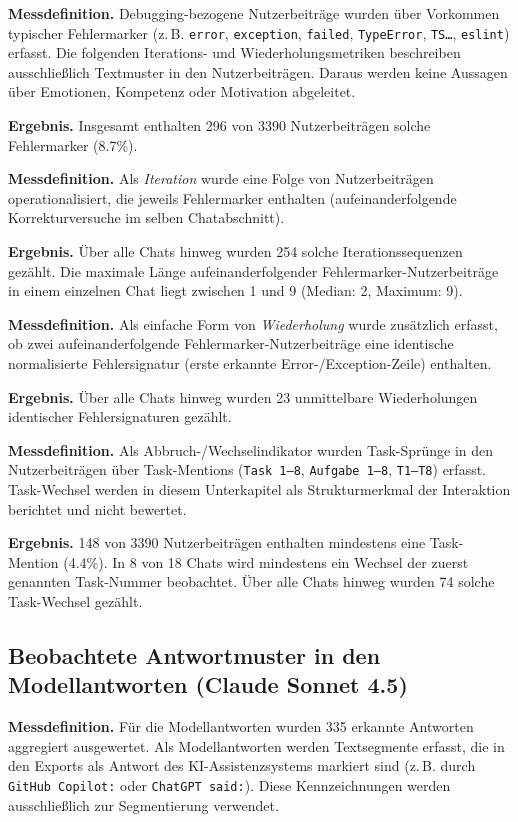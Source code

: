  \textbf{Messdefinition.} Debugging-bezogene Nutzerbeiträge wurden über Vorkommen typischer Fehlermarker (z.\,B. \texttt{error}, \texttt{exception}, \texttt{failed}, \texttt{TypeError}, \texttt{TS\dots}, \texttt{eslint}) erfasst.
Die folgenden Iterations- und Wiederholungsmetriken beschreiben ausschließlich Textmuster in den Nutzerbeiträgen. Daraus werden keine Aussagen über Emotionen, Kompetenz oder Motivation abgeleitet.

 \textbf{Ergebnis.} Insgesamt enthalten 296 von 3390 Nutzerbeiträgen solche Fehlermarker (8.7\%).

 \textbf{Messdefinition.} Als \emph{Iteration} wurde eine Folge von Nutzerbeiträgen operationalisiert, die jeweils Fehlermarker enthalten (aufeinanderfolgende Korrekturversuche im selben Chatabschnitt).

 \textbf{Ergebnis.} Über alle Chats hinweg wurden 254 solche Iterationssequenzen gezählt.
Die maximale Länge aufeinanderfolgender Fehlermarker-Nutzerbeiträge in einem einzelnen Chat liegt zwischen 1 und 9 (Median: 2, Maximum: 9).

 \textbf{Messdefinition.} Als einfache Form von \emph{Wiederholung} wurde zusätzlich erfasst, ob zwei aufeinanderfolgende Fehlermarker-Nutzerbeiträge eine identische normalisierte Fehlersignatur (erste erkannte Error-/Exception-Zeile) enthalten.

 \textbf{Ergebnis.} Über alle Chats hinweg wurden 23 unmittelbare Wiederholungen identischer Fehlersignaturen gezählt.

 \textbf{Messdefinition.} Als Abbruch-/Wechselindikator wurden Task-Sprünge in den Nutzerbeiträgen über Task-Mentions (\texttt{Task 1--8}, \texttt{Aufgabe 1--8}, \texttt{T1--T8}) erfasst.
Task-Wechsel werden in diesem Unterkapitel als Strukturmerkmal der Interaktion berichtet und nicht bewertet.

 \textbf{Ergebnis.} 148 von 3390 Nutzerbeiträgen enthalten mindestens eine Task-Mention (4.4\%).
In 8 von 18 Chats wird mindestens ein Wechsel der zuerst genannten Task-Nummer beobachtet. Über alle Chats hinweg wurden 74 solche Task-Wechsel gezählt.

\subsection{Beobachtete Antwortmuster in den Modellantworten (Claude Sonnet 4.5)}
\label{sec:results_chat_model_patterns}

 \textbf{Messdefinition.} Für die Modellantworten wurden 335 erkannte Antworten aggregiert ausgewertet.
Als Modellantworten werden Textsegmente erfasst, die in den Exports als Antwort des KI-Assistenzsystems markiert sind (z.\,B. durch \texttt{GitHub Copilot:} oder \texttt{ChatGPT said:}). Diese Kennzeichnungen werden ausschließlich zur Segmentierung verwendet.

